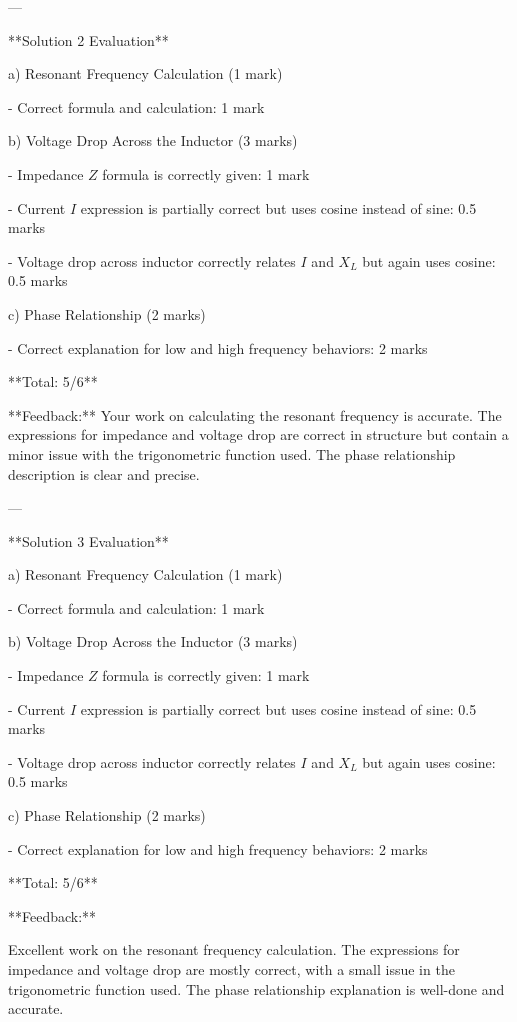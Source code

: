 \documentclass[a4paper,11pt]{article}
\begin{document}
---

**Solution 2 Evaluation**

a) Resonant Frequency Calculation (1 mark)

- Correct formula and calculation: 1 mark

b) Voltage Drop Across the Inductor (3 marks)

- Impedance \( Z \) formula is correctly given: 1 mark

- Current \( I \) expression is partially correct but uses cosine instead of sine: 0.5 marks

- Voltage drop across inductor correctly relates \( I \) and \( X_L \) but again uses cosine: 0.5 marks

c) Phase Relationship (2 marks)

- Correct explanation for low and high frequency behaviors: 2 marks

**Total: 5/6**

**Feedback:**
Your work on calculating the resonant frequency is accurate. The expressions for impedance and voltage drop are correct in structure but contain a minor issue with the trigonometric function used. The phase relationship description is clear and precise.

---

**Solution 3 Evaluation**

a) Resonant Frequency Calculation (1 mark)

- Correct formula and calculation: 1 mark

b) Voltage Drop Across the Inductor (3 marks)

- Impedance \( Z \) formula is correctly given: 1 mark

- Current \( I \) expression is partially correct but uses cosine instead of sine: 0.5 marks

- Voltage drop across inductor correctly relates \( I \) and \( X_L \) but again uses cosine: 0.5 marks

c) Phase Relationship (2 marks)

- Correct explanation for low and high frequency behaviors: 2 marks

**Total: 5/6**

**Feedback:**

Excellent work on the resonant frequency calculation. The expressions for impedance and voltage drop are mostly correct, with a small issue in the trigonometric function used. The phase relationship explanation is well-done and accurate.
\end{document}
